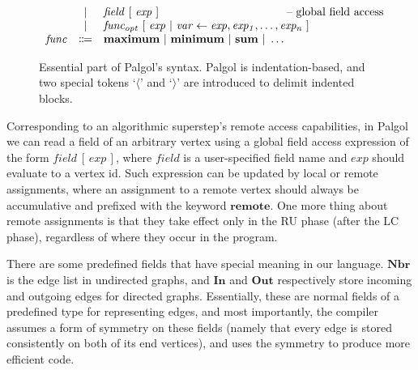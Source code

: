 \documentclass{sokendai_thesis} %
\newcommand{\hsp}[1]{\hspace{-3em}\hbox{#1}}
\begin{document}
\begin{figure}[t]
\[\begin{array}{lclr}
 & | & \mathit{field}~[~\mathit{exp}~] & \hsp{-- global field access} \\
 & | & \mathit{func_{opt}}~[~\mathit{exp}~|~\mathit{var}\leftarrow\mathit{exp},\mathit{exp_1},\ldots,\mathit{exp_n}~] \\
\mathit{func}  & \Coloneqq & \mathbf{maximum}~|~\mathbf{minimum}~|~\mathbf{sum}~|~\ldots \\
 \end{array}
\]
\vspace{-2ex}
\caption{Essential part of Palgol's syntax. Palgol is indentation-based, and two special tokens `$\langle$' and `$\rangle$' are introduced to delimit indented blocks.}
\label{fig:syntax-simplified}
\end{figure}

Corresponding to an algorithmic superstep's remote access capabilities, in Palgol we can read a field of an arbitrary vertex using a global field access expression of the form $\mathit{field}~[\,\mathit{exp}\,]$, 
where $\mathit{field}$ is a user-specified field name and $\mathit{exp}$ should evaluate to a vertex id.
Such expression can be updated by local or remote assignments, where an assignment to a remote vertex should always be accumulative and prefixed with the keyword $\mathbf{remote}$.
One more thing about remote assignments is that they take effect only in the RU phase (after the LC phase), regardless of where they occur in the program.

There are some predefined fields that have special meaning in our language.
$\mathbf{Nbr}$ is the edge list in undirected graphs, and $\mathbf{In}$ and $\mathbf{Out}$ respectively store incoming and outgoing edges for directed graphs.
Essentially, these are normal fields of a predefined type for representing edges, and most importantly, the compiler assumes a form of symmetry on these fields (namely that every edge is stored consistently on both of its end vertices), and uses the symmetry to produce more efficient code.
\end{document}
